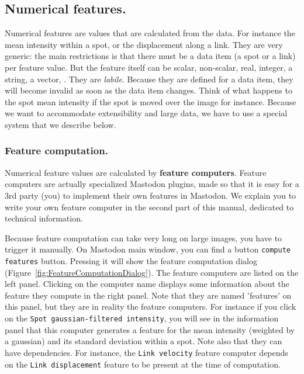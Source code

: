 \subsection{Numerical features.}

Numerical features are values that are calculated from the data.
For instance the mean intensity within a spot, or the displacement along a link.
They are very generic: the main restrictions is that there must be a data item (a spot or a link) per feature value. 
But the feature itself can be scalar, non-scalar, real, integer, a string, a vector, 
\etc.
They are \textit{labile}. 
Because they are defined for a data item, they will become invalid as soon as the data item changes.
Think of what happens to the spot mean intensity if the spot is moved over the image for instance.
Because we want to accommodate extensibility and large data, we have to use a special system that we describe below. 

\subsubsection{Feature computation.}

Numerical feature values are calculated by \textbf{feature computers}.
Feature computers are actually specialized Mastodon plugins, made so that it is easy for a 3rd party (you) to implement their own features in Mastodon.
We explain you to write your own feature computer in the second part of this manual, dedicated to technical information.

Because feature computation can take very long on large images, you have to trigger it manually.
On Mastodon main window, you can find a button \texttt{compute features} button.
Pressing it will show the feature computation dialog (Figure~\ref{fig:FeatureComputationDialog}).
The feature computers are listed on the left panel.
Clicking on the computer name displays some information about the feature they compute in the right panel. 
Note that they are named 'features' on this panel, but they are in reality the feature computers.
For instance if you click on the \texttt{Spot gaussian-filtered intensity}, you will see in the information panel that this computer generates a feature for the mean intensity (weighted by a gaussian) and its standard deviation within a spot.
Note also that they can have dependencies.
For instance, the \texttt{Link velocity} feature computer depends on the \texttt{Link displacement} feature to be present at the time of computation.

